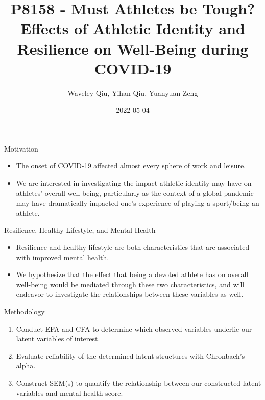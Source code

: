 \documentclass[
  ignorenonframetext,
]{beamer}
\title{P8158 - Must Athletes be Tough?\\
Effects of Athletic Identity and Resilience on Well-Being during
COVID-19}
\author{Waveley Qiu, Yihan Qiu, Yuanyuan Zeng}
\date{2022-05-04}
\providecommand{\tightlist}{%
  \setlength{\itemsep}{0pt}\setlength{\parskip}{0pt}}
\begin{document}
\frame{\titlepage}

\begin{frame}{Motivation}
\protect\hypertarget{motivation}{}
\begin{itemize}
\item
  The onset of COVID-19 affected almost every sphere of work and
  leisure.
\item
  We are interested in investigating the impact athletic identity may
  have on athletes' overall well-being, particularly as the context of a
  global pandemic may have dramatically impacted one's experience of
  playing a sport/being an athlete.
\end{itemize}
\end{frame}

\begin{frame}{Resilience, Healthy Lifestyle, and Mental Health}
\protect\hypertarget{resilience-healthy-lifestyle-and-mental-health}{}
\begin{itemize}
\item
  Resilience and healthy lifestyle are both characteristics that are
  associated with improved mental health.
\item
  We hypothesize that the effect that being a devoted athlete has on
  overall well-being would be mediated through these two
  characteristics, and will endeavor to investigate the relationships
  between these variables as well.
\end{itemize}
\end{frame}

\begin{frame}{Methodology}
\protect\hypertarget{methodology}{}
\begin{enumerate}
\tightlist
\item
  Conduct EFA and CFA to determine which observed variables underlie our
  latent variables of interest.
\item
  Evaluate reliability of the determined latent structures with
  Chronbach's alpha.
\item
  Construct SEM(s) to quantify the relationship between our constructed
  latent variables and mental health score.
\end{enumerate}
\end{frame}
\end{document}
